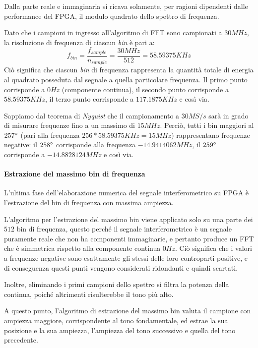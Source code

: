 Dalla parte reale e immaginaria si ricava solamente, per ragioni dipendenti dalle performance del FPGA, il modulo quadrato dello spettro di frequenza.

Dato che i campioni in ingresso all'algoritmo di FFT sono campionati a $30MHz$, la risoluzione di frequenza di ciascun \textit{bin} è pari a:
\begin{equation}
	f_{bin} = \frac{f_{sample}}{n_{sample}} = \frac{30MHz}{512} = 58.59375 KHz
\end{equation}
Ciò significa che ciascun \textit{bin} di frequenza rappresenta la quantità totale di energia al quadrato posseduta dal segnale a quella particolare frequenza. Il primo punto corrisponde a $0Hz$ (componente continua), il secondo punto corrisponde a $58.59375 KHz$, il terzo punto corrisponde a $117.1875KHz$ e così via.

Sappiamo dal teorema di \textit{Nyquist} che il campionamento a $30MS/s$ sarà in grado di misurare frequenze fino a un massimo di $15MHz$. Perciò, tutti i bin maggiori al $257\degree$ (pari alla frequenza $256 * 58.59375 KHz = 15MHz$) rappresentano frequenze negative: il $258\degree$ corrisponde alla frequenza $-14.9414062 MHz$, il $259\degree$ corrisponde a $-14.8828124 MHz$ e così via.

\paragraph{Estrazione del massimo bin di frequenza}
L'ultima fase dell'elaborazione numerica del segnale interferometrico su FPGA è l'estrazione del bin di frequenza con massima ampiezza.

L'algoritmo per l'estrazione del massimo bin viene applicato solo su una parte dei $512$ bin di frequenza, questo perché il segnale interferometrico è un segnale puramente reale che non ha componenti immaginarie, e pertanto produce un FFT che è simmetrica rispetto alla componente continua $0 Hz$. Ciò significa che i valori a frequenze negative sono esattamente gli stessi delle loro controparti positive, e di conseguenza questi punti vengono considerati ridondanti e quindi scartati.

Inoltre, eliminando i primi campioni dello spettro si filtra la potenza della continua, poiché altrimenti risulterebbe il tono più alto. 

A questo punto, l'algoritmo di estrazione del massimo bin valuta il campione con ampiezza maggiore, corrispondente al tono fondamentale, ed estrae la sua posizione e la sua ampiezza, l'ampiezza del tono successivo e quella del tono precedente.

